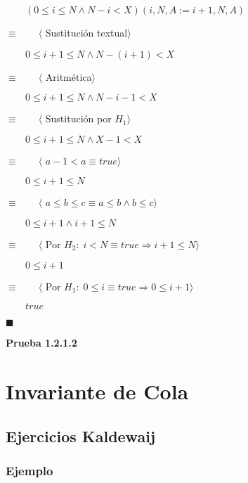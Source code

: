 \documentclass[hidelinks]{article}
\begin{document}
\begin{itemize}
		  $\qquad (0 \leq i \leq N \land N - i < X)(i,N, A := i + 1,N,A)$\par
	      $\equiv \qquad \langle$ Sustitución textual$\rangle$\par
		  $\qquad 0 \leq i + 1 \leq N \land N - (i + 1) < X$\par
	      $\equiv \qquad \langle$ Aritmética$\rangle$\par
		  $\qquad 0 \leq i + 1 \leq N \land N - i - 1 < X$\par
	      $\equiv \qquad \langle$ Sustitución por $H_1\rangle$\par
		  $\qquad 0 \leq i + 1 \leq N \land X - 1 < X$\par
	      $\equiv \qquad \langle$ $a - 1 < a \equiv true\rangle$\par
		  $\qquad 0 \leq i + 1 \leq N$\par
	      $\equiv \qquad \langle$ $a \leq b \leq c \equiv a \leq b \land b \leq c\rangle$\par
		  $\qquad 0 \leq i + 1 \land i + 1 \leq N$\par
	      $\equiv \qquad \langle$ Por $H_2: \; i < N \equiv true \Rightarrow i + 1 \leq N \rangle$\par
		  $\qquad 0 \leq i + 1$\par
	      $\equiv \qquad \langle$ Por $H_1: \; 0 \leq i \equiv true \Rightarrow 0 \leq i + 1 \rangle$\par
		  $\qquad true$\par
		  $\blacksquare$\par

		  \textbf{Prueba 1.2.1.2}\par

\end{itemize}

\newpage

\section{Invariante de Cola}

\subsection{Ejercicios Kaldewaij}\par

\subsubsection{Ejemplo}
\end{document}
